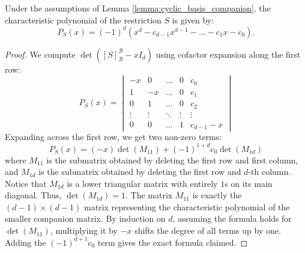 \begin{lemma}\label{lemma:companion_char_poly}
  Under the assumptions of Lemma \ref{lemma:cyclic_basis_companion}, the characteristic polynomial of the restriction $S$ is given by:
  \[
  P_S(x) = (-1)^d (x^d - c_{d-1}x^{d-1} - \dots - c_1 x - c_0).
  \]
\end{lemma}

\begin{proof}
  We compute $\det([S]_{\mathcal{B}}^{\mathcal{B}} - x I_d)$ using cofactor expansion along the first row:
  \[
  P_S(x) = \begin{vmatrix}
    -x & 0 & \dots & 0 & c_0 \\
    1 & -x & \dots & 0 & c_1 \\
    0 & 1 & \dots & 0 & c_2 \\
    \vdots & \vdots & \ddots & \vdots & \vdots \\
    0 & 0 & \dots & 1 & c_{d-1} - x
  \end{vmatrix}
  \]
  Expanding across the first row, we get two non-zero terms:
  \[
  P_S(x) = (-x) \det(M_{11}) + (-1)^{1+d} c_0 \det(M_{1d})
  \]
  where $M_{11}$ is the submatrix obtained by deleting the first row and first column, and $M_{1d}$ is the submatrix obtained by deleting the first row and $d$-th column.
  Notice that $M_{1d}$ is a lower triangular matrix with entirely $1$s on its main diagonal. Thus, $\det(M_{1d}) = 1$. The matrix $M_{11}$ is exactly the $(d-1) \times (d-1)$ matrix representing the characteristic polynomial of the smaller companion matrix. By induction on $d$, assuming the formula holds for $\det(M_{11})$, multiplying it by $-x$ shifts the degree of all terms up by one. Adding the $(-1)^{d+1}c_0$ term gives the exact formula claimed.
\end{proof}

